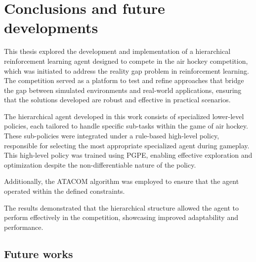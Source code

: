 \chapter{Conclusions and future developments}
\label{ch:conclusions}%



This thesis explored the development and implementation of a hierarchical reinforcement learning agent designed to compete in 
the air hockey competition, which was initiated to address the reality gap problem in reinforcement learning. 
The competition served as a platform to test and refine approaches that bridge the gap between simulated environments 
and real-world applications, ensuring that the solutions developed are robust and effective in practical scenarios.

The hierarchical agent developed in this work consists of specialized lower-level policies, 
each tailored to handle specific sub-tasks within the game of air hockey. 
These sub-policies were integrated under a rule-based high-level policy, responsible for selecting the most appropriate 
specialized agent during gameplay. This high-level policy was trained using PGPE, enabling effective exploration and optimization despite the non-differentiable nature of the policy.

Additionally, the ATACOM algorithm was employed to ensure that the agent operated within the defined constraints.

The results demonstrated that the hierarchical structure allowed the agent to perform effectively in the competition, 
showcasing improved adaptability and performance.


\section{Future works}

